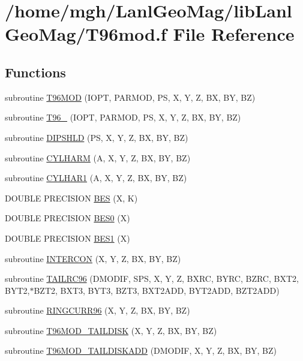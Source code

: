 \hypertarget{_t96mod_8f}{
\section{/home/mgh/LanlGeoMag/libLanlGeoMag/T96mod.f File Reference}
\label{_t96mod_8f}
}
\subsection*{Functions}
\begin{CompactItemize}
\item 
subroutine \hyperlink{_t96mod_8f_d1b3c77658e29c0a582e4458288a48a7}{T96MOD} (IOPT, PARMOD, PS, X, Y, Z, BX, BY, BZ)
\item 
subroutine \hyperlink{_t96mod_8f_7194bba01ce7c686c27501da1f6e23a8}{T96\_} (IOPT, PARMOD, PS, X, Y, Z, BX, BY, BZ)
\item 
subroutine \hyperlink{_t96mod_8f_22b5155440601bb1258e41b0407b707f}{DIPSHLD} (PS, X, Y, Z, BX, BY, BZ)
\item 
subroutine \hyperlink{_t96mod_8f_a1021262eae38287e65bc7ff696f67a2}{CYLHARM} (A, X, Y, Z, BX, BY, BZ)
\item 
subroutine \hyperlink{_t96mod_8f_79feb4cb40c2a7d62058e92afda49cf6}{CYLHAR1} (A, X, Y, Z, BX, BY, BZ)
\item 
DOUBLE PRECISION \hyperlink{_t96mod_8f_273ee53e86263995858fc8c0a702433a}{BES} (X, K)
\item 
DOUBLE PRECISION \hyperlink{_t96mod_8f_bc4ab00dda905b70971f5b3dae102841}{BES0} (X)
\item 
DOUBLE PRECISION \hyperlink{_t96mod_8f_5dd1f9e8738676c1ded360e252f7ef48}{BES1} (X)
\item 
subroutine \hyperlink{_t96mod_8f_2e097fa1f961156bc2ca8b94983b9e4f}{INTERCON} (X, Y, Z, BX, BY, BZ)
\item 
subroutine \hyperlink{_t96mod_8f_a2c7e086277c827ff05f4a9c6eb99b2b}{TAILRC96} (DMODIF, SPS, X, Y, Z, BXRC, BYRC, BZRC, BXT2, BYT2,$\ast$BZT2, BXT3, BYT3, BZT3, BXT2ADD, BYT2ADD, BZT2ADD)
\item 
subroutine \hyperlink{_t96mod_8f_87fae8404610c1e792fff8db728b60a3}{RINGCURR96} (X, Y, Z, BX, BY, BZ)
\item 
subroutine \hyperlink{_t96mod_8f_b0a52ce0e8651f818014bb9cd0040927}{T96MOD\_\-TAILDISK} (X, Y, Z, BX, BY, BZ)
\item 
subroutine \hyperlink{_t96mod_8f_cbb331c88d418399755655497d909b64}{T96MOD\_\-TAILDISKADD} (DMODIF, X, Y, Z, BX, BY, BZ)

\end{CompactItemize}
